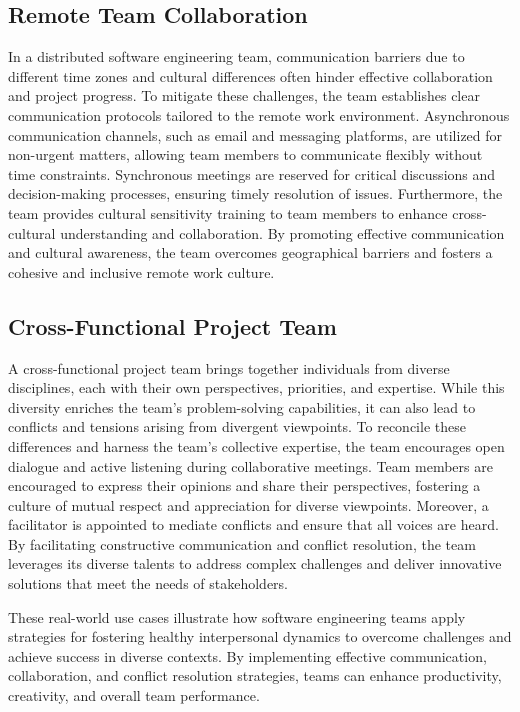 \documentclass{article}
\begin{document}
\subsection{Remote Team Collaboration}
In a distributed software engineering team, communication barriers due to different time zones and cultural differences often hinder effective collaboration and project progress. To mitigate these challenges, the team establishes clear communication protocols tailored to the remote work environment. Asynchronous communication channels, such as email and messaging platforms, are utilized for non-urgent matters, allowing team members to communicate flexibly without time constraints. Synchronous meetings are reserved for critical discussions and decision-making processes, ensuring timely resolution of issues. Furthermore, the team provides cultural sensitivity training to team members to enhance cross-cultural understanding and collaboration. By promoting effective communication and cultural awareness, the team overcomes geographical barriers and fosters a cohesive and inclusive remote work culture.

\subsection{Cross-Functional Project Team}
A cross-functional project team brings together individuals from diverse disciplines, each with their own perspectives, priorities, and expertise. While this diversity enriches the team's problem-solving capabilities, it can also lead to conflicts and tensions arising from divergent viewpoints. To reconcile these differences and harness the team's collective expertise, the team encourages open dialogue and active listening during collaborative meetings. Team members are encouraged to express their opinions and share their perspectives, fostering a culture of mutual respect and appreciation for diverse viewpoints. Moreover, a facilitator is appointed to mediate conflicts and ensure that all voices are heard. By facilitating constructive communication and conflict resolution, the team leverages its diverse talents to address complex challenges and deliver innovative solutions that meet the needs of stakeholders.

These real-world use cases illustrate how software engineering teams apply strategies for fostering healthy interpersonal dynamics to overcome challenges and achieve success in diverse contexts. By implementing effective communication, collaboration, and conflict resolution strategies, teams can enhance productivity, creativity, and overall team performance.
\end{document}

